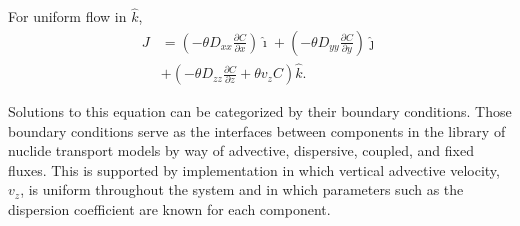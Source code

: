 For uniform flow in $\hat{k}$, 
    \begin{align}
      J &=\left(-\theta D_{xx} \frac{\partial C}{\partial x}
             \right)\hat{\imath}
             + \left( -\theta D_{yy} \frac{\partial C}{\partial y}
            \right)\hat{\jmath}\nonumber\\
            &+ \left( -\theta D_{zz} \frac{\partial C}{\partial z}
             + \theta v_zC \right)\hat{k}.
      \label{unidirflow}
    \end{align}

Solutions to this equation can be categorized by their boundary conditions.  
Those boundary conditions serve as the interfaces between components in the 
\Cyder library of nuclide transport models by way of advective, dispersive, 
coupled, and fixed fluxes.  This is supported by implementation in which 
vertical advective velocity, $v_z$, is uniform throughout the system and in which 
parameters such as the dispersion coefficient are known for each component. 




